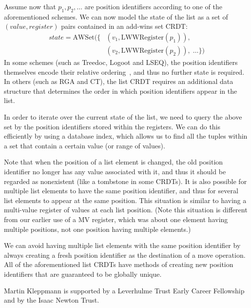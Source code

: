 \documentclass[sigplan,10pt]{acmart}
\begin{document}
Assume now that $p_1, p_2, \dots$ are position identifiers according to one of the aforementioned schemes.
We can now model the state of the list as a set of $(\mathit{value}, \mathit{register})$ pairs contained in an add-wins set CRDT:
\begin{align*}
\mathit{state} = \mathrm{AWSet}(\{ & (v_1, \mathrm{LWWRegister}(p_1)),\\
    & (v_2, \mathrm{LWWRegister}(p_2)), \;\dots\})
\end{align*}
In some schemes (such as Treedoc, Logoot and LSEQ), the position identifiers themselves encode their relative ordering~\cite{Interleaving}, and thus no further state is required.
In others (such as RGA and CT), the list CRDT requires an additional data structure that determines the order in which position identifiers appear in the list.

In order to iterate over the current state of the list, we need to query the above set by the position identifiers stored within the registers.
We can do this efficiently by using a database index, which allows us to find all the tuples within a set that contain a certain value (or range of values).

Note that when the position of a list element is changed, the old position identifier no longer has any value associated with it, and thus it should be regarded as nonexistent (like a tombstone in some CRDTs).
It is also possible for multiple list elements to have the same position identifier, and thus for several list elements to appear at the same position.
This situation is similar to having a multi-value register of values at each list position.
(Note this situation is different from our earlier use of a MV register, which was about one element having multiple positions, not one position having multiple elements.)

We can avoid having multiple list elements with the same position identifier by always creating a fresh position identifier as the destination of a move operation.
All of the aforementioned list CRDTs have methods of creating new position identifiers that are guaranteed to be globally unique.

\begin{acks}
Martin Kleppmann is supported by a Leverhulme Trust Early Career Fellowship and by the Isaac Newton Trust.
\end{acks}


{}
\end{document}
